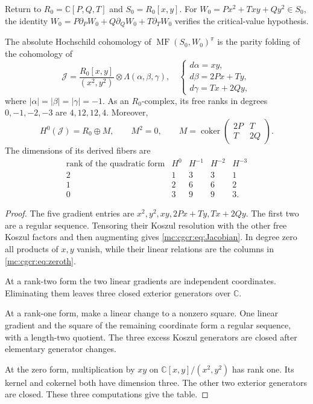 Return to $R_0=\mathbb C[P,Q,T]$ and $S_0=R_0[x,y]$.
For $W_0=Px^2+Txy+Qy^2\in S_0$, the identity
$W_0=P\partial_PW_0+Q\partial_QW_0+T\partial_TW_0$
verifies the critical-value hypothesis.

\begin{proposition}\label{mc:cgcr:prop:Hochschild}
The absolute Hochschild cohomology of
$\operatorname{MF}(S_0,W_0)^\pi$ is the parity folding
of the cohomology of
\begin{equation}\label{mc:cgcr:eq:Jacobian}
 \mathcal J=\frac{R_0[x,y]}{(x^2,y^2)}
                 \otimes\Lambda(\alpha,\beta,\gamma),
 \quad
 \begin{cases}
 d\alpha=xy,\\
 d\beta=2Px+Ty,\\
 d\gamma=Tx+2Qy,
 \end{cases}
\end{equation}
where $|\alpha|=|\beta|=|\gamma|=-1$.
As an $R_0$-complex, its free ranks in degrees
$0,-1,-2,-3$ are $4,12,12,4$.
Moreover,
\begin{equation}\label{mc:cgcr:eq:zeroth}
 H^0(\mathcal J)=R_0\oplus M,\qquad M^2=0,
 \qquad M=\operatorname{coker}
       \begin{pmatrix}2P&T\\T&2Q\end{pmatrix}.
\end{equation}
The dimensions of its derived fibers are
\[
\begin{array}{c|rrrr}
 \text{rank of the quadratic form}&H^0&H^{-1}&H^{-2}&H^{-3}\\\hline
 2&1&3&3&1\\
 1&2&6&6&2\\
 0&3&9&9&3.
\end{array}
\]
\end{proposition}

\begin{proof}
The five gradient entries are
$x^2,y^2,xy,2Px+Ty,Tx+2Qy$.
The first two are a regular sequence. Tensoring their
Koszul resolution with the other free Koszul factors
and then augmenting gives \eqref{mc:cgcr:eq:Jacobian}.
In degree zero all products of $x,y$ vanish, while their
linear relations are the columns in \eqref{mc:cgcr:eq:zeroth}.

At a rank-two form the two linear gradients are independent
coordinates. Eliminating them leaves three closed exterior
generators over $\mathbb C$.

At a rank-one form, make a
linear change to a nonzero square. One linear gradient
and the square of the remaining coordinate form a regular
sequence, with a length-two quotient. The three excess
Koszul generators are closed after elementary generator
changes.

At the zero form, multiplication by $xy$ on
$\mathbb C[x,y]/(x^2,y^2)$ has rank one. Its kernel and
cokernel both have dimension three. The other two exterior
generators are closed. These three computations give the table.
\end{proof}

